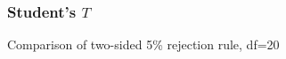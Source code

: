 \documentclass[handout]{beamer}
\begin{document}
   \begin{frame}
   \frametitle{Student's $T$}
   \begin{center}
   \end{center}
   Comparison of two-sided {\color{blue} 5\% rejection rule}, df=20
   \end{frame}


   \begin{frame} 

   \end{frame}

   
\end{document}

